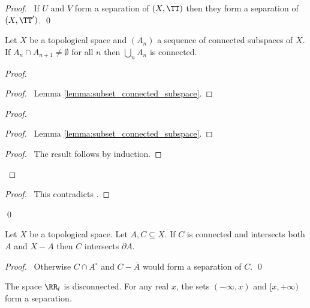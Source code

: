 \begin{proof}
    \pf\ If $U$ and $V$ form a separation of $(X, \TT)$ then they form a separation of $(X, \TT')$. \qed
\end{proof}

\begin{proposition}
    Let $X$ be a topological space and $(A_n)$ a sequence of connected subspaces of $X$. If $A_n \cap A_{n+1} \neq \emptyset$ for all $n$ then $\bigcup_n A_n$ is
    connected.
\end{proposition}

\begin{proof}
    \pf
    \begin{proof}
        \pf\ Lemma \ref{lemma:subset_connected_subspace}.
    \end{proof}
    \begin{proof}
        \pf
        \begin{proof}
            \pf\ Lemma \ref{lemma:subset_connected_subspace}.
        \end{proof}
        \qedstep
        \begin{proof}
            \pf\ The result follows by induction.
        \end{proof}
    \end{proof}
    \qedstep
    \begin{proof}
        \pf\ This contradicts .
    \end{proof}
    \qed
\end{proof}

\begin{proposition}
    Let $X$ be a topological space. Let $A, C \subseteq X$. If $C$ is connected and intersects both $A$ and $X - A$ then $C$ intersects $\partial A$.
\end{proposition}

\begin{proof}
    \pf\ Otherwise $C \cap A^\circ$ and $C - \overline{A}$ would form a separation of $C$. \qed
\end{proof}

\begin{example}
    The space $\RR_l$ is disconnected. For any real $x$, the sets $(- \infty, x)$ and $[x, +\infty)$ form a separation.
\end{example}


